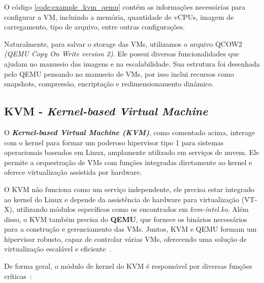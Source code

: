 O código \ref{code:example_kvm_qemu} contém as informações necessárias para configurar a VM, incluindo a memória, quantidade de vCPUs, imagem de carregamento, tipo de arquivo, entre outras configurações.

Naturalmente, para salvar o storage das VMs, utilizamos o arquivo QCOW2 \textit{(QEMU Copy On Write version 2)}. Ele possui diversas funcionalidades que ajudam no manuseio das imagens e na escalabilidade. Sua estrutura foi desenhada pelo QEMU pensando no manuseio de VMs, por isso inclui recursos como snapshots, compressão, encriptação e redimensionamento dinâmico.


\subsection{KVM - \textit{Kernel-based Virtual Machine}}

O \textit{\textbf{Kernel-based Virtual Machine (KVM)}}, como comentado acima, interage com o kernel para formar um poderoso hipervisor tipo 1 para sistemas operacionais baseados em Linux, amplamente utilizado em serviços de nuvem. Ele permite a orquestração de VMs com funções integradas diretamente ao kernel e oferece virtualização assistida por hardware.

O KVM não funciona como um serviço independente, ele precisa estar integrado ao kernel do Linux e depende da assistência de hardware para virtualização (VT-X), utilizando módulos específicos como os encontrados em \textit{kvm-intel.ko}. Além disso, o KVM também precisa do \textbf{QEMU}, que fornece os binários necessários para a construção e gerenciamento das VMs. Juntos, KVM e QEMU formam um hipervisor robusto, capaz de controlar várias VMs, oferecendo uma solução de virtualização escalável e eficiente~\citep{chirammal2016mastering}.

De forma geral, o módulo de kernel do KVM é responsável por diversas funções críticas~\citep{chirammal2016mastering}:

